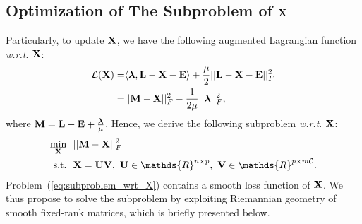 \documentclass[letterpaper]{article}
\def\bM{{\bf M}}
\def\bE{{\bf E}}
\def\blambda{{\bm \lambda}}
\def\calL{{\mathcal{L}}}
\def\calC{{\mathcal{C}}}
\def\bL{{\bf L}}
\def\bU{{\bf U}}
\def\bV{{\bf V}}
\def\dsR{\mathds{R}}
\def\bX{{\bf X}}
\def\bX{{\bf X}}
\def\st{{\text{s.t.}}}
\def\wrt{\emph{w.r.t}}
\begin{document}
\subsection{Optimization of The Subproblem of $\bX$}

Particularly, to update $\bX$, we have the following augmented Lagrangian function \wrt. $\bX$:
\begin{align}\label{eq:langrangian_wrt_X}
  \calL (\bX) = & \langle \blambda, \bL - \bX - \bE \rangle + \frac{\mu}{2} || \bL - \bX - \bE ||_F^2  \nonumber  \\
              = & || \bM - \bX ||_F^2 - \frac{1}{2\mu}|| \blambda ||_F^2   ,
\end{align}
\noindent
where $\bM = \bL - \bE + \frac{\blambda}{\mu}$.
Hence, we derive the following subproblem \wrt. $\bX$:
\begin{align}\label{eq:subproblem_wrt_X}
  \min_{\bX} ~&~ || \bM - \bX ||_F^2    \nonumber \\
  \st        ~&~ \bX = \bU \bV,~\bU \in \dsR^{n \times p},~\bV \in \dsR^{p \times m\calC}   .
\end{align}
Problem~(\ref{eq:subproblem_wrt_X}) contains a smooth loss function of $\bX$.
We thus propose to solve the subproblem by exploiting Riemannian geometry of smooth fixed-rank matrices, which is briefly presented below.
\end{document}
